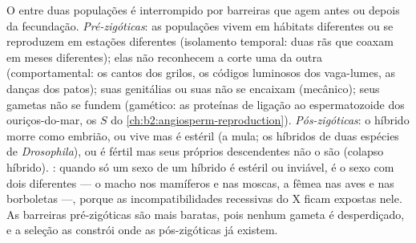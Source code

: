 \begin{proposition}\label{prop:b2:speciation:isolation}
O  entre duas populações é interrompido por barreiras que
agem antes ou depois da fecundação. \emph{Pré-zigóticas}: as populações
vivem em hábitats diferentes ou se reproduzem em estações diferentes
(isolamento temporal: duas rãs que coaxam em meses diferentes); elas não
reconhecem a corte uma da outra (comportamental: os cantos dos grilos,
os códigos luminosos dos vaga-lumes, as danças dos patos); suas
genitálias ou suas  não se encaixam (mecânico); seus gametas não
se fundem (gamético: as proteínas de ligação ao espermatozoide dos
ouriços-do-mar, os 
$S$ do \cref{ch:b2:angiosperm-reproduction}).
\emph{Pós-zigóticas}: o híbrido morre como embrião, ou vive mas é
estéril (a mula; os híbridos de duas espécies de \emph{Drosophila}), ou
é fértil mas seus próprios descendentes não o são (colapso híbrido).
\emph{}: quando só um sexo de um híbrido é estéril ou
inviável, é o sexo com dois  diferentes --- o macho
nos mamíferos e nas moscas, a fêmea nas aves e nas borboletas ---,
porque as incompatibilidades recessivas do X ficam expostas nele. As
barreiras pré-zigóticas são mais baratas, pois nenhum gameta é
desperdiçado, e a seleção as constrói onde as pós-zigóticas já existem.
\end{proposition}

